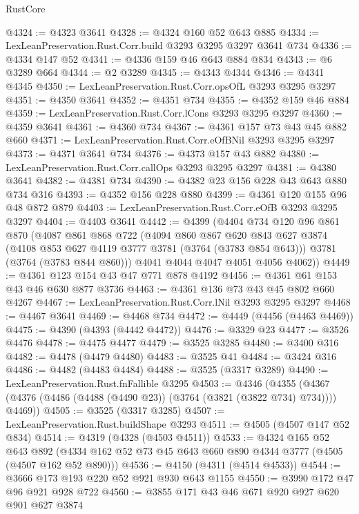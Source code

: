 \begin{lexlean}{RustCore}
\begin{coremodule}
@4324 := @4323 @3641
@4328 := @4324 @160 @52 @643 @885
@4334 := LexLeanPreservation.Rust.Corr.build @3293 @3295 @3297 @3641 @734
@4336 := @4334 @147 @52
@4341 := @4336 @159 @46 @643 @884 @834
@4343 := @6 @3289 @664
@4344 := @2 @3289
@4345 := @4343 @4344
@4346 := @4341 @4345
@4350 := LexLeanPreservation.Rust.Corr.opsOfL @3293 @3295 @3297
@4351 := @4350 @3641
@4352 := @4351 @734
@4355 := @4352 @159 @46 @884
@4359 := LexLeanPreservation.Rust.Corr.lCons @3293 @3295 @3297
@4360 := @4359 @3641
@4361 := @4360 @734
@4367 := @4361 @157 @73 @43 @45 @882 @660
@4371 := LexLeanPreservation.Rust.Corr.eOfBNil @3293 @3295 @3297
@4373 := @4371 @3641 @734
@4376 := @4373 @157 @43 @882
@4380 := LexLeanPreservation.Rust.Corr.callOps @3293 @3295 @3297
@4381 := @4380 @3641
@4382 := @4381 @734
@4390 := @4382 @23 @156 @228 @43 @643 @880 @734 @316
@4393 := @4352 @156 @228 @880
@4399 := @4361 @120 @155 @96 @48 @872 @879
@4403 := LexLeanPreservation.Rust.Corr.eOfB @3293 @3295 @3297
@4404 := @4403 @3641
@4442 := @4399
    (@4404
      @734
      @120
      @96
      @861
      @870
      (@4087
        @861
        @868
        @722
        (@4094
          @860
          @867
          @620
          @843
          @627
          @3874
          (@4108 @853 @627 @4119 @3777 @3781 (@3764 (@3783 @854 @643)))
          @3781
          (@3764 (@3783 @844 @860)))
        @4041
        @4044
        @4047
        @4051
        @4056
        @4062))
@4449 := @4361 @123 @154 @43 @47 @771 @878 @4192
@4456 := @4361 @61 @153 @43 @46 @630 @877 @3736
@4463 := @4361 @136 @73 @43 @45 @802 @660 @4267
@4467 := LexLeanPreservation.Rust.Corr.lNil @3293 @3295 @3297
@4468 := @4467 @3641
@4469 := @4468 @734
@4472 := @4449 (@4456 (@4463 @4469))
@4475 := @4390 (@4393 (@4442 @4472))
@4476 := @3329 @23
@4477 := @3526 @4476
@4478 := @4475 @4477
@4479 := @3525 @3285
@4480 := @3400 @316
@4482 := @4478 (@4479 @4480)
@4483 := @3525 @41
@4484 := @3424 @316
@4486 := @4482 (@4483 @4484)
@4488 := @3525 (@3317 @3289)
@4490 := LexLeanPreservation.Rust.fnFallible @3295
@4503 := @4346
    (@4355 (@4367 (@4376 (@4486 (@4488 (@4490 @23)) (@3764 (@3821 (@3822 @734) @734)))) @4469))
@4505 := @3525 (@3317 @3285)
@4507 := LexLeanPreservation.Rust.buildShape @3293
@4511 := @4505 (@4507 @147 @52 @834)
@4514 := @4319 (@4328 (@4503 @4511))
@4533 := @4324
    @165
    @52
    @643
    @892
    (@4334 @162 @52 @73 @45 @643 @660 @890 @4344 @3777 (@4505 (@4507 @162 @52 @890)))
@4536 := @4150 (@4311 (@4514 @4533))
@4544 := @3666 @173 @193 @220 @52 @921 @930 @643 @1155
@4550 := @3990 @172 @47 @96 @921 @928 @722
@4560 := @3855 @171 @43 @46 @671 @920 @927 @620 @901 @627 @3874

\end{coremodule}
\end{lexlean}
